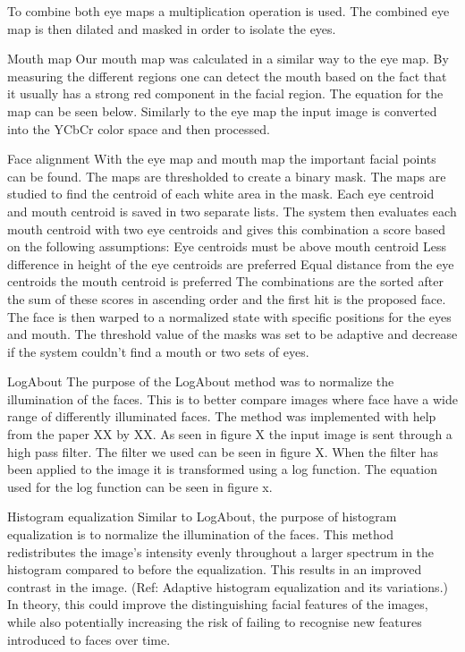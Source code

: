 To combine both eye maps a multiplication operation is used. The combined eye map is then dilated and masked in order to isolate the eyes.


Mouth map
Our mouth map was calculated in a similar way to the eye map. By measuring the different regions one can detect the mouth based on the fact that it usually has a strong red component in the facial region. The equation for the map can be seen below. Similarly to the eye map the input image is converted into the YCbCr color space and then processed.

Face alignment
With the eye map and mouth map the important facial points can be found. The maps are thresholded to create a binary mask. The maps are studied to find the centroid of each white area in the mask. Each eye centroid and mouth centroid is saved in two separate lists. The system then evaluates each mouth centroid with two eye centroids and gives this combination a score based on the following assumptions:
Eye centroids must be above mouth centroid
Less difference in height of the eye centroids are preferred
Equal distance from the eye centroids  the mouth centroid is preferred
The combinations are the sorted after the sum of these scores in ascending order and the first hit is the proposed face. The face is then warped to a normalized state with specific positions for the eyes and mouth. The threshold value of the masks was set to be adaptive and decrease if the system couldn’t find a mouth or two sets of eyes.

LogAbout
The purpose of the LogAbout method was to normalize the illumination of the faces. This is to better compare images where face have a wide range of differently illuminated faces. The method was implemented with help from the paper XX by XX. As seen in figure X the input image is sent through a high pass filter. The filter we used can be seen in figure X. When the filter has been applied to the image it is transformed using a log function. The equation used for the log function can be seen in figure x.

Histogram equalization
Similar to LogAbout, the purpose of histogram equalization is to normalize the illumination of the faces. This method redistributes the image’s intensity evenly throughout a larger spectrum in the histogram compared to before the equalization. This results in an improved contrast in the image. (Ref: Adaptive histogram equalization and its variations.) In theory, this could improve the distinguishing facial features of the images, while also potentially increasing the risk of failing to recognise new features introduced to faces over time.

